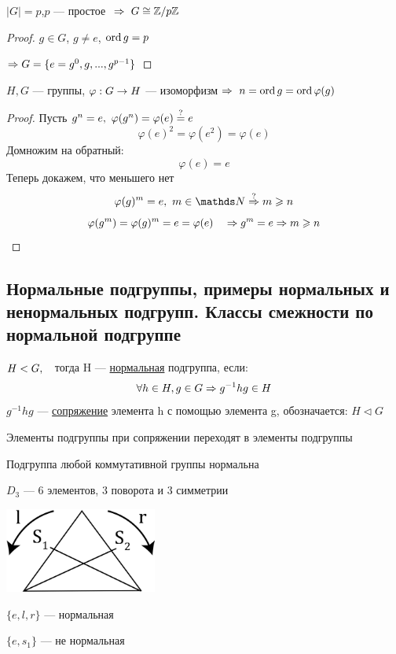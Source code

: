 \documentclass[main]{subfiles}
\begin{document}
	\begin{utv}
	    $|G|=p$,\q $p$ --- простое $\ \Rightarrow\  G \cong \mathbb{Z} /p \mathbb{Z}$
	\end{utv}

	\begin{proof}
	    $g \in G$, $g \neq e$, $\mathop{\rm ord}\nolimits g=p$

	    $\Rightarrow G=\{e=g^0,g,...,g^{p-1}\}$
	\end{proof}

	\begin{utv}
	    $H,G$ --- группы, $\varphi: G \rightarrow H$ --- изоморфизм $\Rightarrow$ $n=\mathop{\rm ord}\nolimits g=\mathop{\rm ord}\nolimits \varphi(g)$
	\end{utv}

	\begin{proof}
	    Пусть $g^n=e,\ \varphi(g^n)=\varphi(e)\os{?}{=}e$
	    \[\varphi(e)^2=\varphi(e^2)=\varphi(e)\]
		Домножим на обратный:
		\[\varphi(e) = e\]
	    Теперь докажем, что меньшего нет
	    \[\varphi(g)^m = e,\ m \in \N \os{?}{\Ra} m \geqslant n\]
		\[\varphi(g^m) = \varphi(g)^m = e = \varphi(e) \quad \Rightarrow g^m = e \Rightarrow m \geqslant n\]
	\end{proof}

	\newpage
	\subsection{Нормальные подгруппы, примеры нормальных и ненормальных подгрупп. Классы смежности по нормальной подгруппе}
	\begin{definition}
	    $H<G,\quad$тогда H --- \ul{нормальная} подгруппа, если:
		\[\forall h \in H, g \in G \Rightarrow g^{-1}h g \in H\]
		$g^{-1}h g$ --- \ul{сопряжение} элемента h с помощью элемента g, обозначается: $H \triangleleft G$
	\end{definition}

	\begin{remark}
	    Элементы подгруппы при сопряжении переходят в элементы подгруппы
	\end{remark}

	\begin{remark}
	    Подгруппа любой коммутативной группы нормальна
	\end{remark}

	\begin{example}
	    $D_3$ --- 6 элементов, 3 поворота и 3 симметрии

	    \includegraphics[width = 5cm]{pics/triangle_d_3.png}

	    $\{e,l,r\}$ --- нормальная

	    $\{e, s_1\}$ --- не нормальная
	\end{example}
\end{document}
